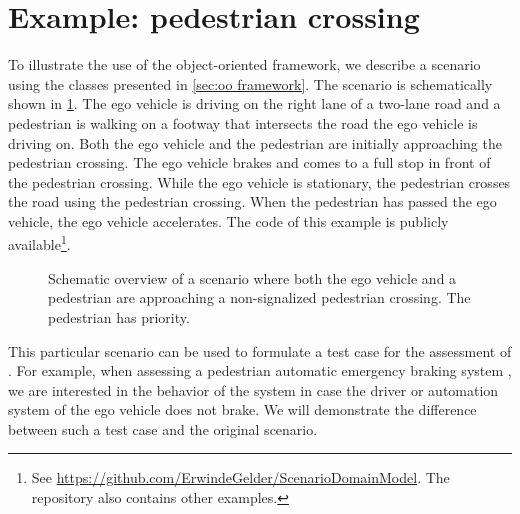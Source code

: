 \section{Example: pedestrian crossing}
\label{sec:example}

To illustrate the use of the \cstartb object-oriented framework\cendb, we describe a scenario using the \cstartb classes \cendb presented in \cref{sec:oo framework}. The scenario is schematically shown in \cref{fig:scenario overview}. The ego vehicle is driving on the right lane of a two-lane road and a pedestrian is walking on a footway that intersects the road the ego vehicle is driving on. Both the ego vehicle and the pedestrian are initially approaching the pedestrian crossing. The ego vehicle brakes and comes to a full stop in front of the pedestrian crossing. While the ego vehicle is stationary, the pedestrian crosses the road using the pedestrian crossing. When the pedestrian has passed the ego vehicle, the ego vehicle accelerates. The code of this example is publicly available\footnote{See \url{https://github.com/ErwindeGelder/ScenarioDomainModel}. The repository also contains other examples.}.

\setlength{\figurewidth}{0.6\linewidth}
\begin{figure}[t]
	\centering
	
	\caption{Schematic overview of a scenario where both the ego vehicle and a pedestrian are approaching a non-signalized pedestrian crossing. The pedestrian has priority. 
	}
	\label{fig:scenario overview}
\end{figure}


\cstartc This particular scenario can be used to formulate a test case for the assessment of . For example, when assessing a pedestrian automatic emergency braking system \autocite{seiniger2015test}, we are interested in the behavior of the system in case the driver or automation system of the ego vehicle does not brake. We will demonstrate the difference between such a test case and the original scenario. \cendc

